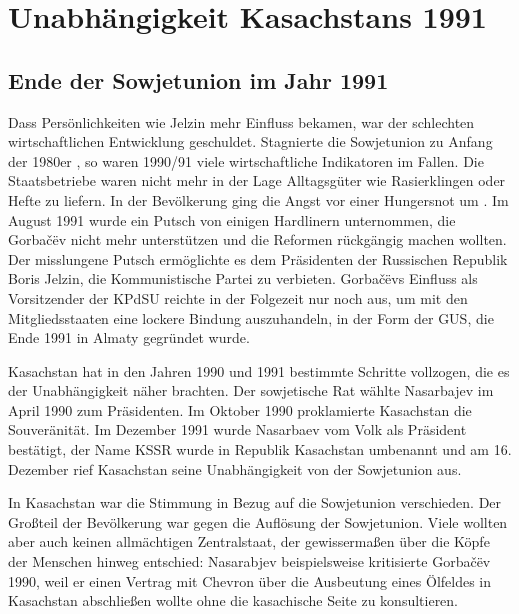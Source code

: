 \documentclass{../../sem_paper}
\begin{document}
\section{Unabhängigkeit Kasachstans 1991}
\subsection{Ende der Sowjetunion im Jahr 1991}
Dass Persönlichkeiten wie Jelzin mehr Einfluss bekamen, war der schlechten
wirtschaftlichen Entwicklung geschuldet. Stagnierte die Sowjetunion zu Anfang der 1980er
, so waren 1990/91 viele wirtschaftliche Indikatoren im Fallen. Die
Staatsbetriebe waren nicht mehr in der Lage Alltagsgüter wie Rasierklingen oder Hefte
zu liefern. In der Bevölkerung ging die Angst vor einer Hungersnot um \autocite[130]{neef2007}. Im August
1991 wurde ein Putsch von einigen Hardlinern unternommen, die Gorbačëv nicht mehr
unterstützen und die Reformen rückgängig machen wollten. Der misslungene Putsch
ermöglichte es dem Präsidenten der Russischen Republik Boris Jelzin, die
Kommunistische Partei zu verbieten. Gorbačëvs Einfluss als Vorsitzender der KPdSU
reichte in der Folgezeit nur noch aus, um mit den Mitgliedsstaaten eine lockere Bindung
auszuhandeln, in der Form der GUS, die Ende 1991 in Almaty gegründet wurde.

Kasachstan hat in den Jahren 1990 und 1991 bestimmte Schritte vollzogen, die es der
Unabhängigkeit näher brachten. Der sowjetische Rat wählte Nasarbajev im April 1990
zum Präsidenten. Im Oktober 1990 proklamierte Kasachstan die Souveränität. Im
Dezember 1991 wurde Nasarbaev vom Volk als Präsident bestätigt, der Name KSSR
wurde in Republik Kasachstan umbenannt und am 16. Dezember rief Kasachstan seine
Unabhängigkeit von der Sowjetunion aus.

In Kasachstan war die Stimmung in Bezug auf die Sowjetunion verschieden. Der
Großteil der Bevölkerung war gegen die Auflösung der Sowjetunion. Viele wollten aber
auch keinen allmächtigen Zentralstaat, der gewissermaßen über die Köpfe der
Menschen hinweg entschied: Nasarabjev beispielsweise kritisierte Gorbačëv 1990, weil
er einen Vertrag mit Chevron über die Ausbeutung eines Ölfeldes in Kasachstan
abschließen wollte ohne die kasachische Seite zu konsultieren.
\end{document}

